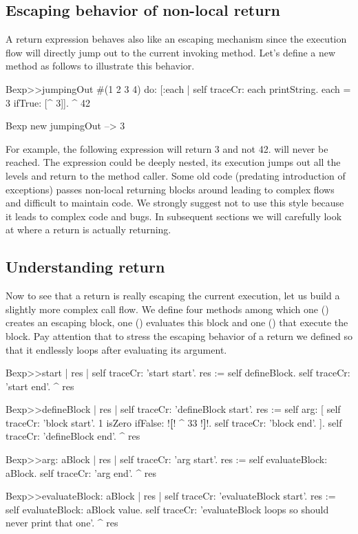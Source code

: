 \documentclass[a4paper,10pt,twoside]{book}
\begin{document}
\subsection{Escaping behavior of non-local return}
A return expression behaves also like an escaping mechanism since the execution flow will directly jump out to the current invoking method. Let's define a new method  as follows to illustrate this behavior.

\begin{code}{}
Bexp>>jumpingOut
	#(1 2 3 4) do: [:each |
					self traceCr: each printString.
					each = 3
						ifTrue: [^ 3]].
	^ 42
	
Bexp new jumpingOut
  --> 3
\end{code}


For example, the following expression  will return 3 and not 42.  will never be reached. The expression \ct{[ ^3 ]} could be deeply nested, its execution jumps out all the levels and return to the method caller. Some old code (predating introduction of exceptions) passes non-local returning blocks around leading to complex flows and difficult to maintain code. We strongly suggest not to use this style because it leads to complex code and bugs.
In subsequent sections we will carefully look at where a return is actually returning.

\subsection{Understanding return}
Now to see that a return is really escaping the current execution, let us build a slightly more complex call flow. We define four methods among which one () creates an escaping block,  one () evaluates this block and one () that execute the block. Pay attention that to stress the escaping behavior of a return we defined  so that it endlessly loops after evaluating its argument.

\begin{code}{}
Bexp>>start
	| res |
	self traceCr: 'start start'.
	res := self defineBlock.
	self traceCr: 'start end'.
	^ res

Bexp>>defineBlock
	| res |
	self traceCr: 'defineBlock start'.
	res := self arg: [ self traceCr: 'block start'.
                            1 isZero ifFalse: !\textbf{[}! ^ 33 !\textbf{]}!.
                            self traceCr: 'block end'. ].
	self traceCr: 'defineBlock end'.
	^ res

Bexp>>arg: aBlock
	| res |
	self traceCr: 'arg start'.
	res := self evaluateBlock: aBlock.
	self traceCr: 'arg end'.
	^ res

Bexp>>evaluateBlock: aBlock
	| res |
	self traceCr: 'evaluateBlock start'.
	res := self evaluateBlock: aBlock value.
	self traceCr: 'evaluateBlock loops so should never print that one'.
	^  res
\end{code}
\end{document}
